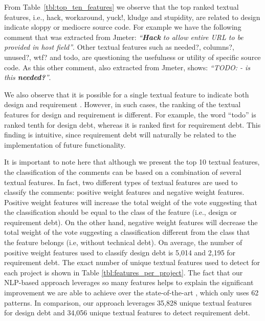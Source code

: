 From Table~\ref{tbl:top_ten_features} we observe that the top ranked textual features, i.e., hack, workaround, yuck!, kludge and stupidity, are related to design \SATD indicate sloppy or mediocre source code. For example we have the following comment that was extracted from Jmeter: \textit{``\textbf{Hack} to allow entire URL to be provided in host field''}. Other textual features such as needed?, columns?, unused?, wtf? and todo, are questioning the usefulness or utility of specific source code. As this other comment, also extracted from Jmeter, shows: \textit{``TODO: - is this \textbf{needed?}''}.

We also observe that it is possible for a single textual feature to indicate both design and requirement \SATD. However, in such cases, the ranking of the textual features for design and requirement \SATD is different. For example, the word ``todo'' is ranked tenth for design debt, whereas it is ranked first for requirement debt. This finding is intuitive, since requirement debt will naturally be related to the implementation of future functionality.

It is important to note here that although we present the top 10 textual features, the classification of the comments can be based on a combination of several textual features. In fact, two different types of textual features are used to classify the comments: positive weight features and negative weight features. Positive weight features will increase the total weight of the vote suggesting that the classification should be equal to the class of the feature (i.e., design or requirement debt). On the other hand, negative weight features will decrease the total weight of the vote suggesting a classification different from the class that the feature belongs (i.e, without technical debt). On average, the number of positive weight features used to classify design debt is 5,014 and 2,195 for requirement debt. The exact number of unique textual features used to detect \SATD for each project is shown in Table \ref{tbl:features_per_project}. The fact that our NLP-based approach leverages so many features helps to explain the significant improvement we are able to achieve over the state-of-the-art , which only uses 62 patterns. In comparison, our approach leverages 35,828 unique textual features for design debt and 34,056 unique textual features to detect requirement debt.

